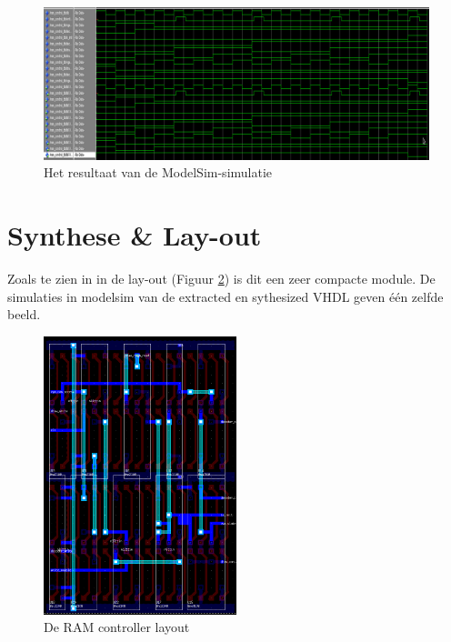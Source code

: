 \documentclass{scrreprt} %
\begin{document}
\begin{figure}[H]
\centering
	\includegraphics[width=\textwidth]{resources/wave-narrow.png}
	\caption{Het resultaat van de ModelSim-simulatie}
	\label{fig:ramcontroller-sim}
\end{figure}

\section{Synthese \& Lay-out}
Zoals te zien in in de lay-out (Figuur \ref{fig:ramcontroller-layout}) is dit een zeer compacte module. De simulaties in modelsim van de extracted en sythesized VHDL geven één zelfde beeld.

\begin{figure}[H]
\centering
	\includegraphics[width=0.5\textwidth]{resources/layout_ramcontroller.png}
	\caption{De RAM controller layout}
	\label{fig:ramcontroller-layout}
\end{figure}

\end{document}
